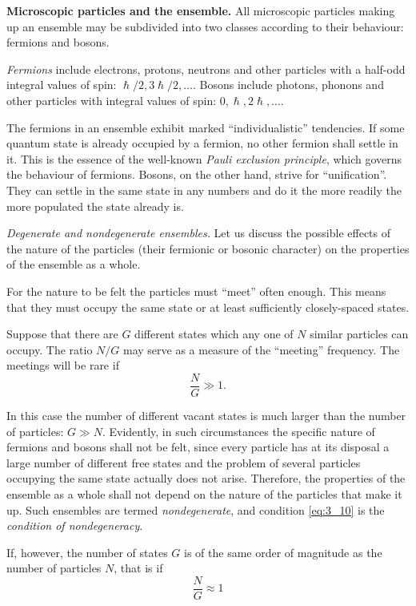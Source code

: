 \textbf{Microscopic particles and the ensemble.} All microscopic particles making up an ensemble may be subdivided into two classes according to their behaviour: fermions and bosons.

\textit{Fermions} include electrons, protons, neutrons and other particles with a half-odd integral values of spin: $\hslash/2, 3\hslash/2,\ldots$. Bosons include photons, phonons and other particles with integral values of spin: $0, \hslash, 2\hslash, \ldots$.

The fermions in an ensemble exhibit marked ``individualistic'' tendencies. If some quantum state is already occupied by a fermion, no other fermion shall settle in it. This is the essence of the well-known \textit{Pauli exclusion principle}, which governs the behaviour of fermions. Bosons, on the other hand, strive for ``unification''. They can settle in the same state in any numbers and do it the more readily the more populated the state already is.

\textit{Degenerate and nondegenerate ensembles.} Let us discuss the possible effects of the nature of the particles (their fermionic or bosonic character) on the properties of the ensemble as a whole.

For the nature to be felt the particles must ``meet'' often enough. This means that they must occupy the same state or at least sufficiently closely-spaced states.

Suppose that there are $G$ different states which any one of $N$ similar particles can occupy. The ratio $N/G$ may serve as a measure of the ``meeting'' frequency. The meetings will be rare if
\begin{equation}\label{eq:3_10}
    \frac{N}{G}\gg 1.
\end{equation}

\noindent
In this case the number of different vacant states is much larger than the number of particles: $G\gg N$. Evidently, in such circumstances the specific nature of fermions and bosons shall not be felt, since every particle has at its disposal a large number of different free states and the problem of several particles occupying the same state actually does not arise. Therefore, the properties of the ensemble as a whole shall not depend on the nature of the particles that make it up. Such ensembles are termed \textit{nondegenerate}, and condition \eqref{eq:3_10} is the \textit{condition of nondegeneracy}.

If, however, the number of states $G$ is of the same order of magnitude as the number of particles $N$, that is if
\begin{equation}\label{eq:3_11}
    \frac{N}{G}\approx 1
\end{equation}

